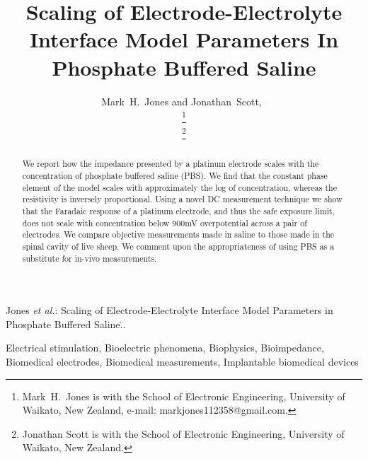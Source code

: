 \documentclass[journal, a4paper]{IEEEtran}
\begin{document}
\title{Scaling of Electrode-Electrolyte Interface Model Parameters In Phosphate Buffered Saline}

\author{Mark~H.~Jones and Jonathan~Scott,~

\thanks{Mark~H.~Jones is with the School of Electronic Engineering, University of Waikato, New Zealand, e-mail: markjones112358@gmail.com.}%

\thanks{Jonathan Scott is with the School of Electronic Engineering, University of Waikato, New Zealand.}

}

{Jones \MakeLowercase{\textit{et al.}}: Scaling of Electrode-Electrolyte Interface Model Parameters in Phosphate Buffered Saline\...}
\maketitle

\begin{abstract}
We report how the impedance presented by a platinum electrode scales with the concentration of phosphate buffered saline (PBS).
We find that the constant phase element of the model scales with approximately the log of concentration, whereas the resistivity is inversely proportional.
Using a novel DC measurement technique we show that the Faradaic response of a platinum electrode, and thus the safe exposure limit, does not scale with concentration below 900\thinspace mV overpotential across a pair of electrodes.
We compare objective measurements made in saline to those made in the spinal cavity of live sheep. We comment upon the appropriateness of using PBS as a substitute for in-vivo measurements.
\end{abstract}

\begin{IEEEkeywords}
    Electrical stimulation, Bioelectric phenomena, Biophysics, Bioimpedance, Biomedical electrodes, Biomedical measurements, Implantable biomedical devices
\end{IEEEkeywords}
\end{document}
